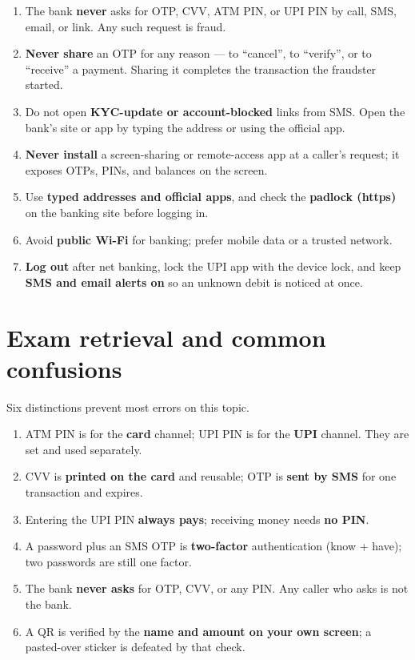 \documentclass[11pt]{article}
\begin{document}
\begin{enumerate}
  \item The bank \textbf{never} asks for OTP, CVV, ATM PIN, or UPI PIN by
    call, SMS, email, or link. Any such request is fraud.
  \item \textbf{Never share} an OTP for any reason --- to ``cancel'', to
    ``verify'', or to ``receive'' a payment. Sharing it completes the
    transaction the fraudster started.
  \item Do not open \textbf{KYC-update or account-blocked} links from SMS.
    Open the bank's site or app by typing the address or using the official
    app.
  \item \textbf{Never install} a screen-sharing or remote-access app at a
    caller's request; it exposes OTPs, PINs, and balances on the screen.
  \item Use \textbf{typed addresses and official apps}, and check the
    \textbf{padlock (https)} on the banking site before logging in.
  \item Avoid \textbf{public Wi-Fi} for banking; prefer mobile data or a
    trusted network.
  \item \textbf{Log out} after net banking, lock the UPI app with the device
    lock, and keep \textbf{SMS and email alerts on} so an unknown debit is
    noticed at once.
\end{enumerate}

\section{Exam retrieval and common confusions}
Six distinctions prevent most errors on this topic.
\begin{enumerate}
  \item ATM PIN is for the \textbf{card} channel; UPI PIN is for the
    \textbf{UPI} channel. They are set and used separately.
  \item CVV is \textbf{printed on the card} and reusable; OTP is
    \textbf{sent by SMS} for one transaction and expires.
  \item Entering the UPI PIN \textbf{always pays}; receiving money needs
    \textbf{no PIN}.
  \item A password plus an SMS OTP is \textbf{two-factor} authentication
    (know + have); two passwords are still one factor.
  \item The bank \textbf{never asks} for OTP, CVV, or any PIN. Any caller
    who asks is not the bank.
  \item A QR is verified by the \textbf{name and amount on your own
    screen}; a pasted-over sticker is defeated by that check.
\end{enumerate}
\end{document}
